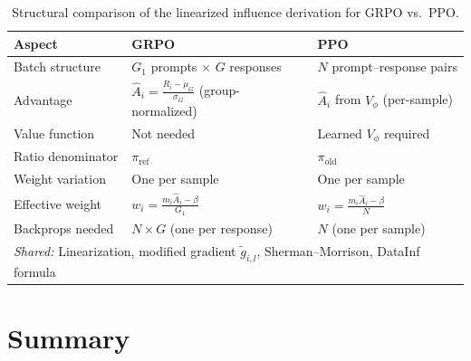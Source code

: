 \documentclass{article}
\begin{document}
\begin{table}[h]
\centering
\begin{tabular}{@{}lll@{}}
\toprule
\textbf{Aspect} & \textbf{GRPO} & \textbf{PPO} \\
\midrule
Batch structure & $G_1$ prompts $\times$ $G$ responses & $N$ prompt--response pairs \\
Advantage & $\hat{A}_i = \frac{R_i - \mu_G}{\sigma_G}$ (group-normalized) & $\hat{A}_i$ from $V_\phi$ (per-sample) \\
Value function & Not needed & Learned $V_\phi$ required \\
Ratio denominator & $\pi_{\mathrm{ref}}$ & $\pi_{\mathrm{old}}$ \\
Weight variation & One per sample & One per sample \\
Effective weight & $w_i = \frac{m_i\hat{A}_i - \beta}{G_1}$ & $w_i = \frac{m_i\hat{A}_i - \beta}{N}$ \\
Backprops needed & $N \times G$ (one per response) & $N$ (one per sample) \\
\midrule
\multicolumn{3}{l}{\textit{Shared:} Linearization, modified gradient $\tilde{g}_{i,l}$, Sherman--Morrison, DataInf formula} \\
\bottomrule
\end{tabular}
\caption{Structural comparison of the linearized influence derivation for GRPO vs.\ PPO.}
\end{table}


\section{Summary}
\end{document}
